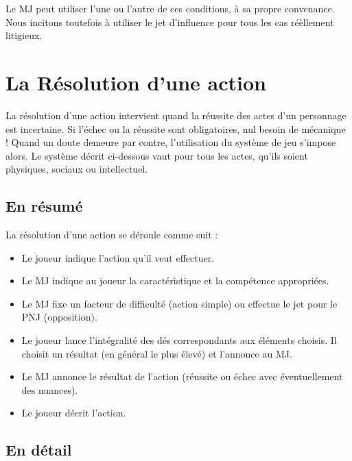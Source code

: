 \documentclass{conf/FusinaClass}
\begin{document}
Le MJ peut utiliser l'une ou l'autre de ces conditions, à sa propre convenance. Nous incitons toutefois à utiliser le jet d'influence pour tous les cas réèllement litigieux.



\part{La Résolution d'une action}
La résolution d'une action intervient quand la réussite des actes d'un personnage est incertaine. Si l'échec ou la réussite sont obligatoires, nul besoin de mécanique ! Quand un doute demeure par contre, l'utilisation du système de jeu s'impose alors. Le système décrit ci-dessous vaut pour tous les actes, qu'ils soient physiques, sociaux ou intellectuel.

\chapter{En résumé}
La résolution d'une action se déroule comme suit : 

\begin{itemize}
\item Le joueur indique l'action qu'il veut effectuer.
\item Le MJ indique au joueur la caractéristique et la compétence appropriées.
\item Le MJ fixe un facteur de difficulté (action simple) ou effectue le jet pour le PNJ (opposition).
\item Le joueur lance l'intégralité des dés correspondants aux éléments choisis. Il choisit un résultat (en général le plus élevé) et l'annonce au MJ.
\item Le MJ annonce le résultat de l'action (réussite ou échec avec éventuellement des nuances).
\item Le joueur décrit l'action.
\end{itemize}

\chapter{En détail}
\end{document}

